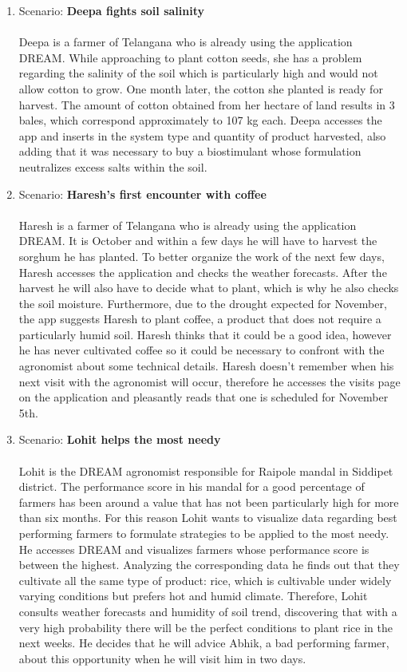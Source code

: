 \begin{enumerate}
\item Scenario: \textbf{Deepa fights soil salinity}\\\\
Deepa is a farmer of Telangana who is already using the application DREAM. While approaching to plant cotton seeds, she has a problem regarding the salinity of the soil which is particularly high and would not allow cotton to grow. One month later, the cotton she planted is ready for harvest. The amount of cotton obtained from her hectare of land results in 3 bales, which correspond approximately to 107 kg each. Deepa accesses the app and inserts in the system type and quantity of product harvested, also adding that it was necessary to buy a biostimulant whose formulation neutralizes excess salts within the soil.\\

\item Scenario: \textbf{Haresh's first encounter with coffee}\\\\
Haresh is a farmer of Telangana who is already using the application DREAM. It is October and within a few days he will have to harvest the sorghum he has planted. To better organize the work of the next few days, Haresh accesses the application and checks the weather forecasts. After the harvest he will also have to decide what to plant, which is why he also checks the soil moisture. Furthermore, due to the drought expected for November, the app suggests Haresh to plant coffee, a product that does not require a particularly humid soil. Haresh thinks that it could be a good idea, however he has never cultivated coffee so it could be necessary to confront with the agronomist about some technical details. Haresh doesn't remember when his next visit with the agronomist will occur, therefore he accesses the visits page on the application and pleasantly reads that one is scheduled for November 5th.
\\

\item Scenario: \textbf{Lohit helps the most needy}\\\\
Lohit is the DREAM agronomist responsible for Raipole mandal in Siddipet district. The performance score in his mandal for a good percentage of farmers has been around a value that has not been particularly high for more than six months. For this reason Lohit wants to visualize data regarding best performing farmers to formulate strategies to be applied to the most needy. He accesses DREAM and visualizes farmers whose performance score is between the highest. Analyzing the corresponding data he finds out that they cultivate all the same type of product: rice, which is cultivable under widely varying conditions but prefers hot and humid climate. Therefore, Lohit consults weather forecasts and humidity of soil trend, discovering that with a very high probability there will be the perfect conditions to plant rice in the next weeks. He decides that he will advice Abhik, a bad performing farmer, about this opportunity when he will visit him in two days. 
\\

\end{enumerate}

\newpage